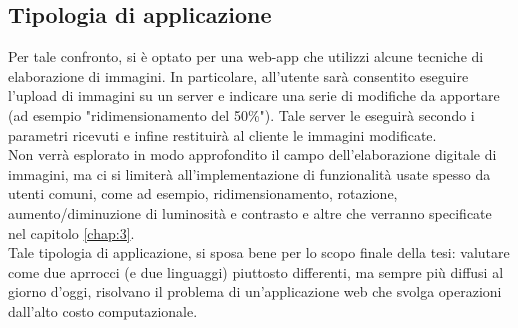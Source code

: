 \subsection{Tipologia di applicazione}
Per tale confronto, si è optato per una web-app che utilizzi alcune tecniche di elaborazione di immagini.
In particolare, all'utente sarà consentito eseguire l'upload di immagini su un server e indicare una serie di modifiche da apportare (ad esempio "ridimensionamento del 50\%"). Tale server le eseguirà secondo i parametri ricevuti e infine restituirà al cliente le immagini modificate.
\\Non verrà esplorato in modo approfondito il campo dell'elaborazione digitale di immagini, ma ci si limiterà all'implementazione di funzionalità usate spesso da utenti comuni, come ad esempio, ridimensionamento, rotazione, aumento/diminuzione di luminosità e contrasto e altre che verranno specificate nel capitolo \ref{chap:3}.
\\Tale tipologia di applicazione, si sposa bene per lo scopo finale della tesi: valutare come due aprrocci (e due linguaggi) piuttosto differenti, ma sempre più diffusi al giorno d'oggi, risolvano il problema di un'applicazione web che svolga operazioni dall'alto costo computazionale.
